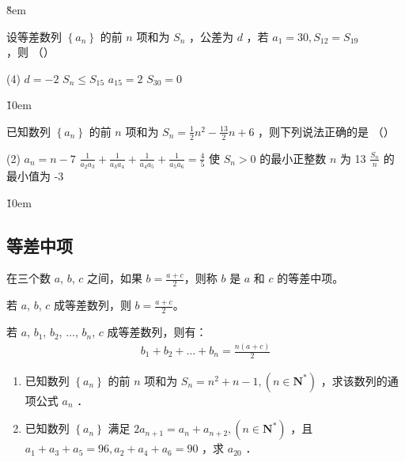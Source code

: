 \v{8em}

\begin{example}
    设等差数列 $\left\{a_n\right\}$ 的前 $n$ 项和为 $S_n$ ，公差为 $d$ ，若 $a_1=30, S_{12}=S_{19}$ ，则 （\qquad）
    \begin{tasks}(4)
        \task $d=-2$
        \task $S_n \leq S_{15}$
        \task $a_{15}=2$
        \task $S_{30}=0$
    \end{tasks}
\end{example}

\v{10em}

\begin{example}
    已知数列 $\left\{a_n\right\}$ 的前 $n$ 项和为 $S_n=\frac{1}{2} n^2-\frac{13}{2} n+6$ ，则下列说法正确的是 （\qquad）
    \begin{tasks}(2)
        \task $a_n=n-7$
        \task $\frac{1}{a_2 a_3}+\frac{1}{a_3 a_4}+\frac{1}{a_4 a_5}+\frac{1}{a_5 a_6}=\frac{4}{5}$
        \task 使 $S_n>0$ 的最小正整数 $n$ 为 13
        \task $\frac{S_n}{n}$ 的最小值为 -3
    \end{tasks}
\end{example}

\v{10em}

\subsection{等差中项}

\begin{definition}
    在三个数 $a$, $b$, $c$ 之间，如果 $b = \frac{a+c}{2}$，则称 $b$ 是 $a$ 和 $c$ 的等差中项。
\end{definition}

\begin{theorem}
    若 $a$, $b$, $c$ 成等差数列，则 $b = \frac{a+c}{2}$。

    若 $a$, $b_1$, $b_2$, $\ldots$, $b_n$, $c$ 成等差数列，则有：
    \begin{align}
        b_1 + b_2 + \ldots + b_n = \frac{n(a+c)}{2}
    \end{align}
\end{theorem}

\begin{example}
    \begin{enumerate}
        \item 已知数列 $\left\{a_n\right\}$ 的前 $n$ 项和为 $S_n=n^2+n-1,\left(n \in \mathbf{N}^*\right)$ ，求该数列的通项公式 $a_n$ ．
        \item 已知数列 $\left\{a_n\right\}$ 满足 $2 a_{n+1}=a_n+a_{n+2},\left(n \in \mathbf{N}^*\right)$ ，且 $a_1+a_3+a_5=96, a_2+a_4+a_6=90$ ，求 $a_{20}$ ．
    \end{enumerate}
\end{example}

